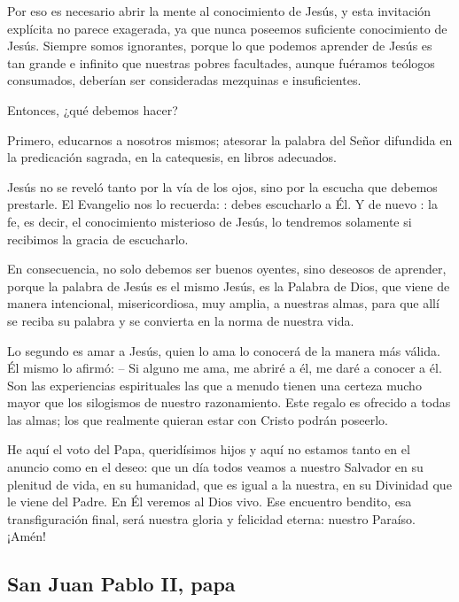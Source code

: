 \begin{body}
Por eso es necesario abrir la mente al conocimiento de Jesús, y esta invitación explícita no parece exagerada, ya que nunca poseemos suficiente conocimiento de Jesús. Siempre somos ignorantes, porque lo que podemos aprender de Jesús es tan grande e infinito que nuestras pobres facultades, aunque fuéramos teólogos consumados, deberían ser consideradas mezquinas e insuficientes.

Entonces, ¿qué debemos hacer?

Primero, educarnos a nosotros mismos; atesorar la palabra del Señor difundida en la predicación sagrada, en la catequesis, en libros adecuados.


Jesús no se reveló tanto por la vía de los ojos, sino por la escucha que debemos prestarle. El Evangelio nos lo recuerda: : debes escucharlo a Él. Y de nuevo : la fe, es decir, el conocimiento misterioso de Jesús, lo tendremos solamente si recibimos la gracia de escucharlo.

En consecuencia, no solo debemos ser buenos oyentes, sino deseosos de aprender, porque la palabra de Jesús es el mismo Jesús, es la Palabra de Dios, que viene de manera intencional, misericordiosa, muy amplia, a nuestras almas, para que allí se reciba su palabra y se convierta en la norma de nuestra vida.

Lo segundo es amar a Jesús, quien lo ama lo conocerá de la manera más válida. Él mismo lo afirmó:  – Si alguno me ama, me abriré a él, me daré a conocer a él. Son las experiencias espirituales las que a menudo tienen una certeza mucho mayor que los silogismos de nuestro razonamiento. Este regalo es ofrecido a todas las almas; los que realmente quieran estar con Cristo podrán poseerlo.

He aquí el voto del Papa, queridísimos hijos y aquí no estamos tanto en el anuncio como en el deseo: que un día todos veamos a nuestro Salvador en su plenitud de vida, en su humanidad, que es igual a la nuestra, en su Divinidad que le viene del Padre. En Él veremos al Dios vivo. Ese encuentro bendito, esa transfiguración final, será nuestra gloria y felicidad eterna: nuestro Paraíso. ¡Amén!
\end{body}


\newsection
\subsection{San Juan Pablo II, papa}


